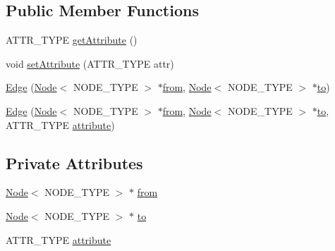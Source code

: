\subsection*{Public Member Functions}
\begin{DoxyCompactItemize}
\item 
A\+T\+T\+R\+\_\+\+T\+Y\+P\+E \hyperlink{class_edge_a2df8bfbb50ff9d2238f32418b74399d1}{get\+Attribute} ()
\item 
void \hyperlink{class_edge_adc6be810bc8cc3b51579519f3f9fcedd}{set\+Attribute} (A\+T\+T\+R\+\_\+\+T\+Y\+P\+E attr)
\item 
\hyperlink{class_edge_a73151e4f116ff2a5f2e8e3dc6dcc5eae}{Edge} (\hyperlink{class_node}{Node}$<$ N\+O\+D\+E\+\_\+\+T\+Y\+P\+E $>$ $\ast$\hyperlink{class_edge_a13cea896b6ae1a52181316e5e41e9576}{from}, \hyperlink{class_node}{Node}$<$ N\+O\+D\+E\+\_\+\+T\+Y\+P\+E $>$ $\ast$\hyperlink{class_edge_a3e4b84ccacbb450aa7e683b0f138160d}{to})
\item 
\hyperlink{class_edge_a28a28f285386a188b7f52f3b84092022}{Edge} (\hyperlink{class_node}{Node}$<$ N\+O\+D\+E\+\_\+\+T\+Y\+P\+E $>$ $\ast$\hyperlink{class_edge_a13cea896b6ae1a52181316e5e41e9576}{from}, \hyperlink{class_node}{Node}$<$ N\+O\+D\+E\+\_\+\+T\+Y\+P\+E $>$ $\ast$\hyperlink{class_edge_a3e4b84ccacbb450aa7e683b0f138160d}{to}, A\+T\+T\+R\+\_\+\+T\+Y\+P\+E \hyperlink{class_edge_aefe66838413029050cb582f64f48510e}{attribute})
\end{DoxyCompactItemize}
\subsection*{Private Attributes}
\begin{DoxyCompactItemize}
\item 
\hyperlink{class_node}{Node}$<$ N\+O\+D\+E\+\_\+\+T\+Y\+P\+E $>$ $\ast$ \hyperlink{class_edge_a13cea896b6ae1a52181316e5e41e9576}{from}
\item 
\hyperlink{class_node}{Node}$<$ N\+O\+D\+E\+\_\+\+T\+Y\+P\+E $>$ $\ast$ \hyperlink{class_edge_a3e4b84ccacbb450aa7e683b0f138160d}{to}
\item 
A\+T\+T\+R\+\_\+\+T\+Y\+P\+E \hyperlink{class_edge_aefe66838413029050cb582f64f48510e}{attribute}
\end{DoxyCompactItemize}


